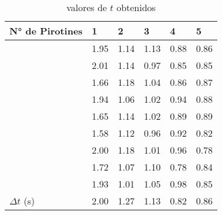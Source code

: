 \documentclass{article}
\begin{document}
\begin{table}[H]
\centering
\begin{tabular}{|l|l|l|l|l|l|}
\hline
\rowcolor[HTML]{CACACA} 
N° de Pirotines & 1 & 2 & 3 & 4 & 5 \\ \hline
\cellcolor[HTML]{CACACA} & 1.95 & 1.14 & 1.13 & 0.88 & 0.86 \\ \cline{2-6} 
\cellcolor[HTML]{CACACA} & 2.01 & 1.14 & 0.97 & 0.85 & 0.85 \\ \cline{2-6} 
\cellcolor[HTML]{CACACA} & 1.66 & 1.18 & 1.04 & 0.86 & 0.87 \\ \cline{2-6} 
\cellcolor[HTML]{CACACA} & 1.94 & 1.06 & 1.02 & 0.94 & 0.88 \\ \cline{2-6} 
\cellcolor[HTML]{CACACA} & 1.65 & 1.14 & 1.02 & 0.89 & 0.89 \\ \cline{2-6} 
\cellcolor[HTML]{CACACA} & 1.58 & 1.12 & 0.96 & 0.92 & 0.82 \\ \cline{2-6} 
\cellcolor[HTML]{CACACA} & 2.00 & 1.18 & 1.01 & 0.96 & 0.78 \\ \cline{2-6} 
\cellcolor[HTML]{CACACA} & 1.72 & 1.07 & 1.10 & 0.78 & 0.84 \\ \cline{2-6} 
\cellcolor[HTML]{CACACA} & 1.93 & 1.01 & 1.05 & 0.98 & 0.85 \\ \cline{2-6} 
\multirow{-10}{*}{\cellcolor[HTML]{CACACA}$\Delta t$ (s)} & 2.00 & 1.27 & 1.13 & 0.82 & 0.86 \\ \hline
\end{tabular}
\caption{valores de $t$ obtenidos}
\label{table:tvalues}
\end{table}
\end{document}
